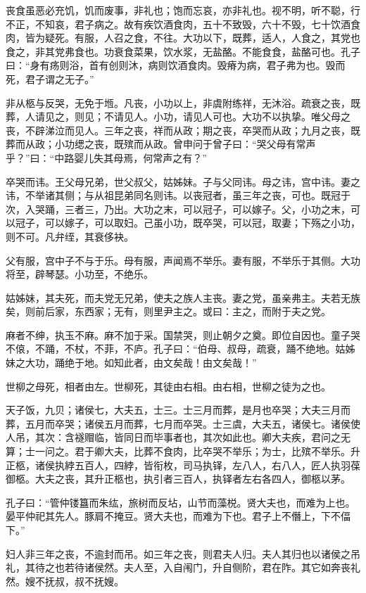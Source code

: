 \documentclass[]{article}
\begin{document}
丧食虽恶必充饥，饥而废事，非礼也；饱而忘哀，亦非礼也。视不明，听不聪，行不正，不知哀，君子病之。故有疾饮酒食肉，五十不致毁，六十不毁，七十饮酒食肉，皆为疑死。有服，人召之食，不往。大功以下，既葬，适人，人食之，其党也食之，非其党弗食也。功衰食菜果，饮水浆，无盐酪。不能食食，盐酪可也。孔子曰：``身有疡则浴，首有创则沐，病则饮酒食肉。毁瘠为病，君子弗为也。毁而死，君子谓之无子。''

非从柩与反哭，无免于堩。凡丧，小功以上，非虞附练祥，无沐浴。疏衰之丧，既葬，人请见之，则见；不请见人。小功，请见人可也。大功不以执挚。唯父母之丧，不辟涕泣而见人。三年之丧，祥而从政；期之丧，卒哭而从政；九月之丧，既葬而从政；小功缌之丧，既殡而从政。曾申问于曾子曰：``哭父母有常声乎？''曰：``中路婴儿失其母焉，何常声之有？''

卒哭而讳。王父母兄弟，世父叔父，姑姊妹。子与父同讳。母之讳，宫中讳。妻之讳，不举诸其侧；与从祖昆弟同名则讳。以丧冠者，虽三年之丧，可也。既冠于次，入哭踊，三者三，乃出。大功之末，可以冠子，可以嫁子。父，小功之末，可以冠子，可以嫁子，可以取妇。己虽小功，既卒哭，可以冠，取妻；下殇之小功，则不可。凡弁绖，其衰侈袂。

父有服，宫中子不与于乐。母有服，声闻焉不举乐。妻有服，不举乐于其侧。大功将至，辟琴瑟。小功至，不绝乐。

姑姊妹，其夫死，而夫党无兄弟，使夫之族人主丧。妻之党，虽亲弗主。夫若无族矣，则前后家，东西家；无有，则里尹主之。或曰：主之，而附于夫之党。

麻者不绅，执玉不麻。麻不加于采。国禁哭，则止朝夕之奠。即位自因也。童子哭不偯，不踊，不杖，不菲，不庐。孔子曰：``伯母、叔母，疏衰，踊不绝地。姑姊妹之大功，踊绝于地。如知此者，由文矣哉！由文矣哉！''

世柳之母死，相者由左。世柳死，其徒由右相。由右相，世柳之徒为之也。

天子饭，九贝；诸侯七，大夫五，士三。士三月而葬，是月也卒哭；大夫三月而葬，五月而卒哭；诸侯五月而葬，七月而卒哭。士三虞，大夫五，诸侯七。诸侯使人吊，其次：含襚赗临，皆同日而毕事者也，其次如此也。卿大夫疾，君问之无算；士一问之。君于卿大夫，比葬不食肉，比卒哭不举乐；为士，比殡不举乐。升正柩，诸侯执綍五百人，四綍，皆衔枚，司马执铎，左八人，右八人，匠人执羽葆御柩。大夫之丧，其升正柩也，执引者三百人，执铎者左右各四人，御柩以茅。

孔子曰：``管仲镂簋而朱纮，旅树而反坫，山节而藻棁。贤大夫也，而难为上也。晏平仲祀其先人。豚肩不掩豆。贤大夫也，而难为下也。君子上不僭上，下不偪下。''

妇人非三年之丧，不逾封而吊。如三年之丧，则君夫人归。夫人其归也以诸侯之吊礼，其待之也若待诸侯然。夫人至，入自闱门，升自侧阶，君在阼。其它如奔丧礼然。嫂不抚叔，叔不抚嫂。
\end{document}
